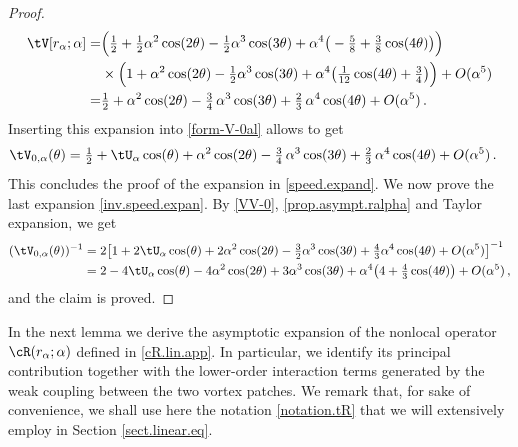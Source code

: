 \documentclass[a4paper,reqno,10pt]{article}
\begin{document}
\begin{proof}
\begin{align*}
    \tV[r_\alpha;\alpha]=&\Big(\tfrac12 +\tfrac12\alpha^2 \cos(2\theta)-\tfrac12\alpha^3  \cos(3\theta) +\alpha^4\big(-\tfrac58+\tfrac38\cos(4\theta)\big)\Big)\\
    &\times\Big(1 + \alpha^2 \cos(2\theta) - \tfrac12 \alpha^3 \cos(3\theta) + \alpha^4 \big( \tfrac{1}{12}\cos(4\theta) + \tfrac{3}{4} \big)\Big)+O(\alpha^5)\\
    =&\tfrac12 + \alpha^2\cos(2\theta) - \tfrac34\,\alpha^3\cos(3\theta) + \tfrac{2}{3}\,\alpha^4\cos(4\theta) + O(\alpha^5)\,.
    \end{align*}
    Inserting this expansion into \eqref{form-V-0al} allows to get
    \begin{align}\label{VV-0}
	{\tV_{0,\alpha}(\theta)}
    &=\tfrac12+\tU_{\alpha} \cos(\theta)+ \alpha^2\cos(2\theta) - \tfrac34\,\alpha^3\cos(3\theta) + \tfrac{2}{3}\,\alpha^4\cos(4\theta)+O(\alpha^5)\,.
    \end{align} 
	 This concludes the proof of the expansion in \eqref{speed.expand}. We now prove the last expansion \eqref{inv.speed.expan}.
By \eqref{VV-0}, \eqref{prop.asympt.ralpha} and Taylor expansion, we get
	\begin{align*}
		(\tV_{0,\alpha}(\theta))^{-1} & = 2\big[  1 + 2\tU_{\alpha} \cos(\theta) + 2\alpha^2 \cos(2\theta) - \tfrac32 \alpha^3 \cos(3\theta) +\tfrac{4}{3} \alpha^4 \cos(4\theta) + O(\alpha^5) \big]^{-1} \\
		& = 2 -4\tU_{\alpha} \cos(\theta) -4\alpha^2 \cos(2\theta) + 3 \alpha^3 \cos(3\theta)  + \alpha^4\big( 4 +\tfrac{4}{3}  \cos(4\theta)\big) + O(\alpha^5) \,,
	\end{align*}
	and the claim is proved.
\end{proof}
In the next lemma we derive the asymptotic expansion of the nonlocal operator $\cR(r_\alpha;\alpha)$ defined in \eqref{cR.lin.app}. In particular, we identify its principal contribution together with the lower-order interaction terms generated by the weak coupling between the two vortex patches. We remark that, for sake of convenience, we shall use here the notation \eqref{notation.tR} that we will extensively employ in Section \ref{sect.linear.eq}.
\end{document}
